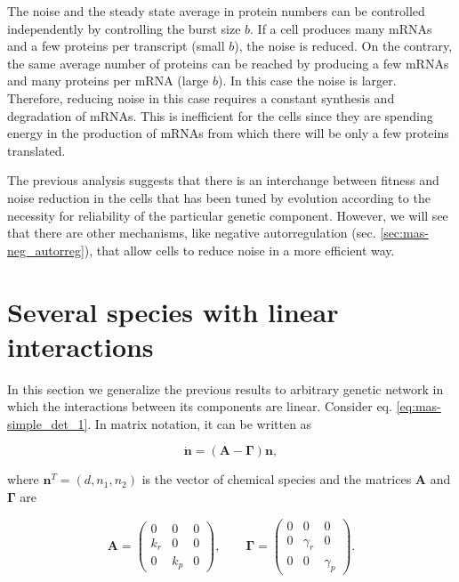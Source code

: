 The noise and the steady state average in protein numbers can be controlled independently by controlling the burst size $b$. If a cell produces many mRNAs and a few proteins per transcript (small $b$), the noise is reduced. On the contrary, the same average number of proteins can be reached by producing a few mRNAs and many proteins per mRNA (large $b$). In this case the noise is larger. Therefore, reducing noise in this case requires a constant synthesis and degradation of mRNAs. This is inefficient for the cells since they are spending energy in the production of mRNAs from which there will be only a few proteins translated. 

The previous analysis suggests that there is an interchange between fitness and noise reduction in the cells that has been tuned by evolution according to the necessity for reliability of the particular genetic component. However, we will see that there are other mechanisms, like negative autorregulation (sec. \ref{sec:mas-neg_autorreg}), that allow cells to reduce noise in a more efficient way.

\section{Several species with linear interactions}

In this section we generalize the previous results to arbitrary genetic network in which the interactions between its components are linear. Consider eq. \eqref{eq:mas-simple_det_1}. In matrix notation, it can be written as

\begin{equation}
  \label{eq:matdet}
  \mathbf{\dot{n}} = \left( \mathbf{A} - \mathbf{\Gamma} \right) \mathbf{n},
\end{equation}

where $\mathbf{n}^T=(d,n_1,n_2)$ is the vector of chemical species and the matrices $\mathbf{A}$ and $\mathbf{\Gamma}$ are

\begin{equation}
  \label{eq:mas_G_single}
  \mathbf{A} =
  \begin{pmatrix}
    0 & 0 & 0 \\
    k_r & 0 & 0 \\
    0 & k_p & 0
  \end{pmatrix},\quad\quad
  \mathbf{\Gamma} =
  \begin{pmatrix}
    0 & 0 & 0 \\
    0 & \gamma_r & 0 \\
    0 & 0 & \gamma_p 
  \end{pmatrix}. 
\end{equation}

